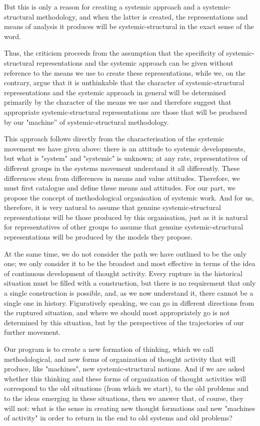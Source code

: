 \documentclass[11pt,a4paper]{article}
\begin{document}
But this is only a reason for creating a systemic approach and a
systemic-structural methodology, and when the latter is created, the
representations and means of analysis it produces will be systemic-structural
in the exact sense of the word.

Thus, the criticism proceeds from the assumption that the specificity of
systemic-structural representations and the systemic approach can be given
without reference to the means we use to create these representations, while
we, on the contrary, argue that it is unthinkable that the character of
systemic-structural representations and the systemic approach in general will
be determined primarily by the character of the means we use and therefore
suggest that appropriate systemic-structural representations are those that
will be produced by our "machine” of systemic-structural methodology.

This approach follows directly from the characterisation of the systemic
movement we have given above: there is an attitude to systemic developments,
but what is "system" and "systemic" is unknown; at any rate, representatives
of different groups in the systems movement understand it all differently.
These differences stem from differences in means and value attitudes.
Therefore, we must first catalogue and define these means and attitudes. For
our part, we propose the concept of methodological organisation of systemic
work. And for us, therefore, it is very natural to assume that genuine
systemic-structural representations will be those produced by this
organisation, just as it is natural for representatives of other groups to
assume that genuine systemic-structural representations will be produced by
the models they propose.

At the same time, we do not consider the path we have outlined to be the only
one; we only consider it to be the broadest and most effective in terms of the
idea of continuous development of thought activity. Every rupture in the
historical situation must be filled with a construction, but there is no
requirement that only a single construction is possible, and, as we now
understand it, there cannot be a single one in history. Figuratively speaking,
we can go in different directions from the ruptured situation, and where we
should most appropriately go is not determined by this situation, but by the
perspectives of the trajectories of our further movement.

Our program is to create a new formation of thinking, which we call
methodological, and new forms of organization of thought activity that will
produce, like "machines", new systemic-structural notions. And if we are asked
whether this thinking and these forms of organization of thought activities
will correspond to the old situations (from which we start), to the old
problems and to the ideas emerging in these situations, then we answer that,
of course, they will not: what is the sense in creating new thought formations
and new "machines of activity" in order to return in the end to old systems
and old problems?
\end{document}
